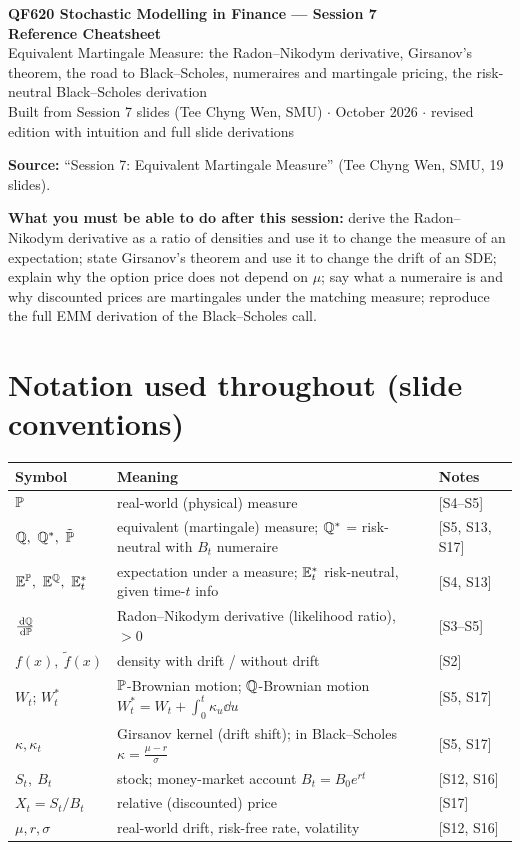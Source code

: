 \documentclass[10pt]{article}
\begin{document}
\begin{center}
{\LARGE\bfseries QF620 Stochastic Modelling in Finance --- Session 7\\[2pt] Reference Cheatsheet}\\[6pt]
{\large Equivalent Martingale Measure: the Radon--Nikodym derivative, Girsanov's theorem, the road to Black--Scholes, numeraires and martingale pricing, the risk-neutral Black--Scholes derivation}\\[4pt]
{\small Built from Session 7 slides (Tee Chyng Wen, SMU) $\cdot$ October 2026 $\cdot$ revised edition with intuition and full slide derivations}
\end{center}
\tableofcontents
\vspace{4pt}
\textbf{Source:} ``Session 7: Equivalent Martingale Measure'' (Tee Chyng Wen, SMU, 19 slides).

\legend

\textbf{What you must be able to do after this session:} derive the Radon--Nikodym derivative as a ratio of densities and use it to change the measure of an expectation; state Girsanov's theorem and use it to change the drift of an SDE; explain why the option price does not depend on $\mu$; say what a numeraire is and why discounted prices are martingales under the matching measure; reproduce the full EMM derivation of the Black--Scholes call.

\section*{Notation used throughout (slide conventions)}
{\small\renewcommand{\arraystretch}{1.12}
\begin{tabularx}{\linewidth}{@{}l X l@{}}\toprule
Symbol & Meaning & Notes\\\midrule
$\mathbb{P}$ & real-world (physical) measure & [S4--S5]\\
$\Q,\ \Q^*,\ \tilde\Prob$ & equivalent (martingale) measure; $\mathbb{Q}^*$ = risk-neutral with $B_t$ numeraire & [S5, S13, S17]\\
$\E^\Prob,\ \E^\Q,\ \E^*_t$ & expectation under a measure; $\mathbb{E}^*_t$ risk-neutral, given time-$t$ info & [S4, S13]\\
$\frac{\,\mathrm{d}\mathbb{Q}}{\,\mathrm{d}\mathbb{P}}$ & Radon--Nikodym derivative (likelihood ratio), $>0$ & [S3--S5]\\
$f(x),\ \tilde f(x)$ & density with drift / without drift & [S2]\\
$W_t$; $W^*_t$ & $\mathbb{P}$-Brownian motion; $\mathbb{Q}$-Brownian motion $W^*_t=W_t+\int_0^t\kappa_u\dd u$ & [S5, S17]\\
$\kappa,\kappa_t$ & Girsanov kernel (drift shift); in Black--Scholes $\kappa=\frac{\mu-r}{\sigma}$ & [S5, S17]\\
$S_t,\ B_t$ & stock; money-market account $B_t=B_0e^{rt}$ & [S12, S16]\\
$X_t=S_t/B_t$ & relative (discounted) price & [S17]\\
$\mu,r,\sigma$ & real-world drift, risk-free rate, volatility & [S12, S16]\\\bottomrule
\end{tabularx}}
\end{document}
